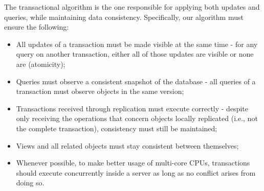 The transactional algorithm is the one responsible for applying both updates and queries, while maintaining data consistency.
Specifically, our algorithm must ensure the following:
\begin{itemize}
	\item All updates of a transaction must be made visible at the same time - for any query on another transaction, either all of those updates are visible or none are (atomicity);
	\item Queries must observe a consistent snapshot of the database - all queries of a transaction must observe objects in the same version;
	\item Transactions received through replication must execute correctly - despite only receiving the operations that concern objects locally replicated (i.e., not the complete transaction), consistency must still be maintained;   
	\item Views and all related objects must stay consistent between themselves;
	\item Whenever possible, to make better usage of multi-core CPUs, transactions should execute concurrently inside a server as long as no conflict arises from doing so.
\end{itemize}


